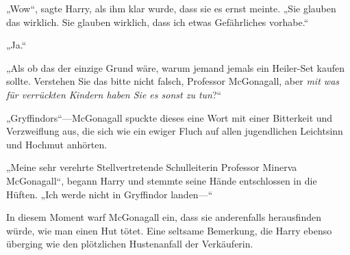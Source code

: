 „Wow“, sagte Harry, als ihm klar wurde, dass sie es ernst meinte. „Sie glauben das wirklich. Sie glauben wirklich, dass ich etwas Gefährliches vorhabe.“

„Ja.“

„Als ob das der einzige Grund wäre, warum jemand jemals ein Heiler-Set kaufen sollte. Verstehen Sie das bitte nicht falsch, Professor McGonagall, aber \emph{mit was für verrückten Kindern haben Sie es sonst zu tun}?“

„Gryffindors“—McGonagall spuckte dieses eine Wort mit einer Bitterkeit und Verzweiflung aus, die sich wie ein ewiger Fluch auf allen jugendlichen Leichtsinn und Hochmut anhörten.

„Meine sehr verehrte Stellvertretende Schulleiterin Professor Minerva McGonagall“, begann Harry und stemmte seine Hände entschlossen in die Hüften. „Ich werde nicht in Gryffindor landen—“

In diesem Moment warf McGonagall ein, dass sie anderenfalls herausfinden würde, wie man einen Hut tötet. Eine seltsame Bemerkung, die Harry ebenso überging wie den plötzlichen Hustenanfall der Verkäuferin.

